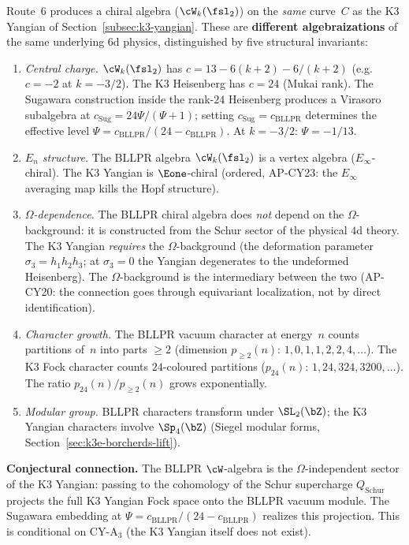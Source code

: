 \begin{remark}
\label{rem:bllpr-k3-connection}
Route~6 produces a chiral algebra ($\cW_k(\fsl_2)$) on the \emph{same} curve~$C$ as the K3 Yangian of Section~\ref{subsec:k3-yangian}.  These are \textbf{different algebraizations} of the same underlying $6$d physics, distinguished by five structural invariants:
\begin{enumerate}[label=\textup{(\roman*)}]
 \item \emph{Central charge.} $\cW_k(\fsl_2)$ has $c = 13 - 6(k+2) - 6/(k+2)$ (e.g.\ $c = -2$ at $k = -3/2$). The K3 Heisenberg has $c = 24$ (Mukai rank).  The Sugawara construction inside the rank-$24$ Heisenberg produces a Virasoro subalgebra at $c_{\mathrm{Sug}} = 24\Psi/(\Psi + 1)$; setting $c_{\mathrm{Sug}} = c_{\mathrm{BLLPR}}$ determines the effective level $\Psi = c_{\mathrm{BLLPR}}/(24 - c_{\mathrm{BLLPR}})$.  At $k = -3/2$: $\Psi = -1/13$.

 \item \emph{$E_n$ structure.}  The BLLPR algebra $\cW_k(\fsl_2)$ is a vertex algebra ($E_\infty$-chiral). The K3 Yangian is $\Eone$-chiral (ordered, AP-CY23: the $E_\infty$ averaging map kills the Hopf structure).

 \item \emph{$\Omega$-dependence.}  The BLLPR chiral algebra does \emph{not} depend on the $\Omega$-background: it is constructed from the Schur sector of the physical $4$d theory.  The K3 Yangian \emph{requires} the $\Omega$-background (the deformation parameter $\sigma_3 = h_1 h_2 h_3$; at $\sigma_3 = 0$ the Yangian degenerates to the undeformed Heisenberg).  The $\Omega$-background is the intermediary between the two (AP-CY20: the connection goes through equivariant localization, not by direct identification).

 \item \emph{Character growth.}  The BLLPR vacuum character at energy~$n$ counts partitions of~$n$ into parts $\geq 2$ (dimension $p_{\geq 2}(n)$: $1, 0, 1, 1, 2, 2, 4, \ldots$).  The K3 Fock character counts $24$-coloured partitions ($p_{24}(n)$: $1, 24, 324, 3200, \ldots$).  The ratio $p_{24}(n)/p_{\geq 2}(n)$ grows exponentially.

 \item \emph{Modular group.}  BLLPR characters transform under $\SL_2(\bZ)$; the K3 Yangian characters involve $\Sp_4(\bZ)$ (Siegel modular forms, Section~\ref{sec:k3e-borcherds-lift}).
\end{enumerate}

\noindent\textbf{Conjectural connection.}  The BLLPR $\cW$-algebra is the $\Omega$-independent sector of the K3 Yangian: passing to the cohomology of the Schur supercharge $Q_{\mathrm{Schur}}$ projects the full K3 Yangian Fock space onto the BLLPR vacuum module.  The Sugawara embedding at $\Psi = c_{\mathrm{BLLPR}}/(24 - c_{\mathrm{BLLPR}})$ realizes this projection.  This is conditional on CY-A$_3$ (the K3 Yangian itself does not exist).
\end{remark}

